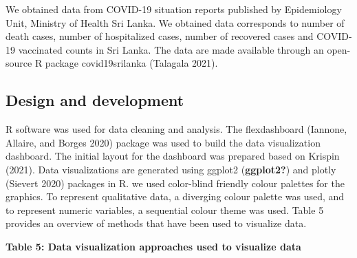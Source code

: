 \documentclass[
]{article}
\begin{document}
We obtained data from COVID-19 situation reports published by
Epidemiology Unit, Ministry of Health Sri Lanka. We obtained data
corresponds to number of death cases, number of hospitalized cases,
number of recovered cases and COVID-19 vaccinated counts in Sri Lanka.
The data are made available through an open-source R package
covid19srilanka (Talagala 2021).

\hypertarget{design-and-development}{%
\subsection{Design and development}\label{design-and-development}}

R software was used for data cleaning and analysis. The flexdashboard
(Iannone, Allaire, and Borges 2020) package was used to build the data
visualization dashboard. The initial layout for the dashboard was
prepared based on Krispin (2021). Data visualizations are generated
using ggplot2 (\textbf{ggplot2?}) and plotly (Sievert 2020) packages in
R. we used color-blind friendly colour palettes for the graphics. To
represent qualitative data, a diverging colour palette was used, and to
represent numeric variables, a sequential colour theme was used. Table 5
provides an overview of methods that have been used to visualize data.

\textbf{Table 5: Data visualization approaches used to visualize data}
\end{document}
